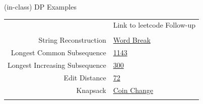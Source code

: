 \documentclass[10pt,a4paper]{article}
\begin{document}
\begin{multicols}{3}
\begin{textbox}{(in-class) DP Examples }
    \begin{tabular}{r|p{}}\scriptsize
        & Link to leetcode Follow-up  \\
        & \\
        String Reconstruction & \href{https://leetcode.com/problems/word-break/)}{Word Break} \\
        Longest Common Subsequence & \href{https://leetcode.com/problems/longest-common-subsequence/}{1143}\\
        Longest Increasing Subsequence & \href{https://leetcode.com/problems/longest-increasing-subsequence/}{300}\\
        Edit Distance & \href{https://leetcode.com/problems/edit-distance/}{72} \\
        Knapsack & \href{https://leetcode.com/problems/coin-change/}{Coin Change} \\\\
    \end{tabular}
\end{textbox}


\end{multicols}
\end{document}
